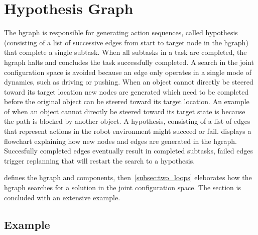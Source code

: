 \section{Hypothesis Graph}%
\label{sec:hgraph}
The \ac{hgraph} is responsible for generating action sequences, called hypothesis (consisting of a list of successive edges from start to target node in the \ac{hgraph}) that complete a single subtask. When all subtasks in a task are completed, the \ac{hgraph} halts and concludes the task successfully completed. A search in the joint configuration space is avoided because an edge only operates in a single mode of dynamics, such as driving or pushing. When an object cannot directly be steered toward its target location new nodes are generated which need to be completed before the original object can be steered toward its target location. An example of when an object cannot directly be steered toward its target state is because the path is blocked by another object. A hypothesis, consisting of a list of edges that represent actions in the robot environment might succeed or fail.  displays a flowchart explaining how new nodes and edges are generated in the \ac{hgraph}. Succesfully completed edges eventually result in completed subtasks, failed edges trigger replanning that will restart the search to a hypothesis.\bs

 defines the \ac{hgraph} and components, then~\cref{subsec:two_loops} eleborates how the \ac{hgraph} searches for a solution in the joint configuration space. The section is concluded with an extensive example.\bs








\subsection{Example}%
\label{subsec:hgraph_example}

